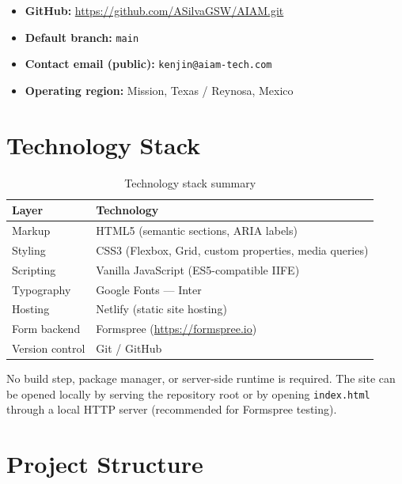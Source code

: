 \documentclass[11pt,a4paper]{article}
\begin{document}
\begin{itemize}[noitemsep]
  \item \textbf{GitHub:} \url{https://github.com/ASilvaGSW/AIAM.git}
  \item \textbf{Default branch:} \texttt{main}
  \item \textbf{Contact email (public):} \texttt{kenjin@aiam-tech.com}
  \item \textbf{Operating region:} Mission, Texas / Reynosa, Mexico
\end{itemize}

\section{Technology Stack}

\begin{table}[h]
  \centering
  \begin{tabular}{@{}ll@{}}
    \toprule
    \textbf{Layer} & \textbf{Technology} \\
    \midrule
    Markup       & HTML5 (semantic sections, ARIA labels) \\
    Styling      & CSS3 (Flexbox, Grid, custom properties, media queries) \\
    Scripting    & Vanilla JavaScript (ES5-compatible IIFE) \\
    Typography   & Google Fonts --- Inter \\
    Hosting      & Netlify (static site hosting) \\
    Form backend & Formspree (\url{https://formspree.io}) \\
    Version control & Git / GitHub \\
    \bottomrule
  \end{tabular}
  \caption{Technology stack summary}
\end{table}

No build step, package manager, or server-side runtime is required. The site
can be opened locally by serving the repository root or by opening
\texttt{index.html} through a local HTTP server (recommended for Formspree
testing).

\section{Project Structure}
\end{document}

